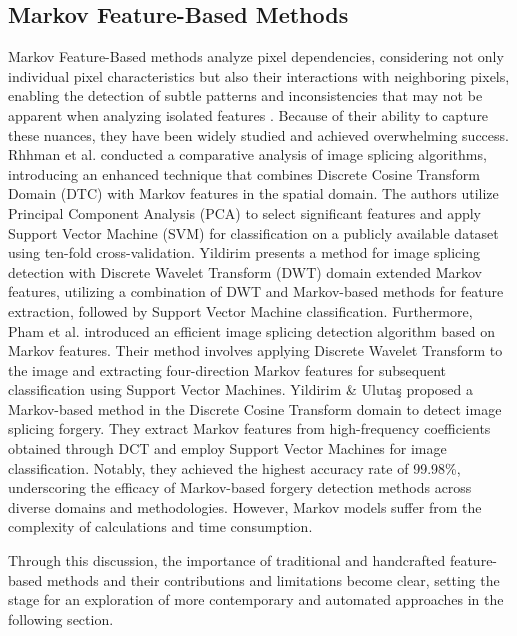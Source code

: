 \subsection{Markov Feature-Based Methods} \label{sec:ss3}

Markov Feature-Based methods analyze pixel dependencies, considering not only individual pixel characteristics but also their interactions with neighboring pixels, enabling the detection of subtle patterns and inconsistencies that may not be apparent when analyzing isolated features \cite{pham2019efficient}. Because of their ability to capture these nuances, they have been widely studied \cite{MeenaTyagi2021} and achieved overwhelming success. Rhhman et al. \cite{ur2021comparative} conducted a comparative analysis of image splicing algorithms, introducing an enhanced technique that combines Discrete Cosine Transform Domain (DTC) with Markov features in the spatial domain. The authors utilize Principal Component Analysis (PCA) to select significant features and apply Support Vector Machine (SVM) for classification on a publicly available dataset using ten-fold cross-validation. Yildirim \cite{yildirim2018image} presents a method for image splicing detection with Discrete Wavelet Transform (DWT) domain extended Markov features, utilizing a combination of DWT and Markov-based methods for feature extraction, followed by Support Vector Machine classification. Furthermore, Pham et al. \cite{pham2019efficient} introduced an efficient image splicing detection algorithm based on Markov features. Their method involves applying Discrete Wavelet Transform to the image and extracting four-direction Markov features for subsequent classification using Support Vector Machines. Yildirim \& Ulutaş \cite{yildirim2018markov} proposed a Markov-based method in the Discrete Cosine Transform domain to detect image splicing forgery. They extract Markov features from high-frequency coefficients obtained through DCT and employ Support Vector Machines for image classification. Notably, they achieved the highest accuracy rate of 99.98\%, underscoring the efficacy of Markov-based forgery detection methods across diverse domains and methodologies. However, Markov models suffer from the complexity of calculations and time consumption.

Through this discussion, the importance of traditional and handcrafted feature-based methods and their contributions and limitations become clear, setting the stage for an exploration of more contemporary and automated approaches in the following section.

